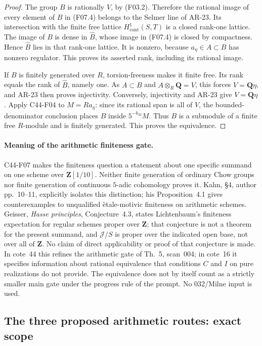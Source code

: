 \documentclass[11pt]{article}
\theoremstyle{remark}\newtheorem{remark}[theorem]{Remark}
\begin{document}
\begin{proof}
The group $B$ is rationally $V$, by (F03.2).  Therefore the
rational image of every element of $B$ in (F07.4) belongs to
the Selmer line of AR-23.  Its intersection with the finite
free lattice $H^1_{\mathrm{cont}}(S,T)$ is a closed rank-one
lattice.  The image of $B$ is dense in $\widehat B$, whose
image in (F07.4) is closed by compactness.  Hence
$\widehat B$ lies in that rank-one lattice.  It is nonzero,
because $a_\eta\in A\subset B$ has nonzero regulator.
This proves its asserted rank, including its rational image.

If $B$ is finitely generated over $R$, torsion-freeness makes
it finite free.  Its rank equals the rank of $\widehat B$,
namely one.  As $A\subset B$ and $A\otimes_R\mathbf Q=V$,
this forces $V=\mathbf Q\eta$, and AR-23 then proves
injectivity.  Conversely, injectivity and AR-23 give
$V=\mathbf Q\eta$.  Apply C44-F04 to $M=Ra_\eta$: since
its rational span is all of $V$, the bounded-denominator
conclusion places $B$ inside $5^{-b_M}M$.  Thus $B$ is a
submodule of a finite free $R$-module and is finitely
generated.  This proves the equivalence.
\end{proof}

\paragraph{Meaning of the arithmetic finiteness gate.}
C44-F07 makes the finiteness question a statement about one
specific summand on one scheme over $\mathbf Z[1/10]$.
Neither finite generation of ordinary Chow groups nor
finite generation of continuous \(5\)-adic cohomology proves
it.  Kahn, \S4, author pp.~10--11, explicitly isolates this
distinction; his Proposition~4.1 gives counterexamples to
unqualified \`etale-motivic finiteness on arithmetic schemes.
Geisser, \emph{Hasse principles}, Conjecture~4.3, states
Lichtenbaum's finiteness expectation for regular schemes
proper over $\mathbf Z$; that conjecture is not a theorem
for the present summand, and $\mathcal J/S$ is proper over
the indicated open base, not over all of $\mathbf Z$.
No claim of direct applicability or proof of that conjecture
is made.  In cote~44 this refines the arithmetic gate of
Th.~5, scan~004; in cote~16 it specifies information about
rational equivalence that conditions $C$ and $I$ on pure
realizations do not provide.  The equivalence does not by
itself count as a strictly smaller main gate under the
progress rule of the prompt.  No 032/Milne input is used.

\subsection{The three proposed arithmetic routes: exact scope}
\end{document}

